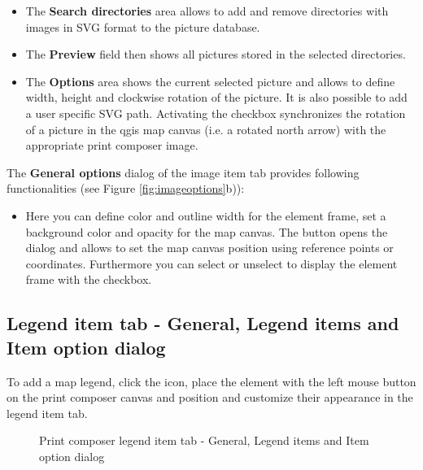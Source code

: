 \begin{itemize}[label=--]
\item The \textbf{Search directories} area allows to add and remove
directories with images in SVG format to the picture database. 
\item The \textbf{Preview} field then shows all pictures stored in the
selected directories.
\item The \textbf{Options} area shows the current selected picture and allows
to define width, height and clockwise rotation of the picture. It is also possible 
to add a user specific SVG path. Activating the
 checkbox synchronizes the rotation of a picture in
the qgis map canvas (i.e. a rotated north arrow) with the appropriate print
composer image.
\end{itemize}


The \textbf{General options} dialog of the image item tab provides following
functionalities (see Figure \ref{fig:imageoptions}b)):

\begin{itemize}[label=--]
\item Here you can define color and outline width for the element frame, set
a background color and opacity for the map canvas. The 
button opens the  dialog and allows to set the map
canvas position using reference points or coordinates. Furthermore you can
select or unselect to display the element frame with the  checkbox.
\end{itemize}

\subsection{Legend item tab - General, Legend items and Item option dialog }

To add a map legend, click the 
icon, place the element with the left mouse button on the print composer
canvas and position and customize their appearance in the legend item tab.

\begin{figure}[h]
\centering
   \hspace{1cm}
   \hspace{1cm}
   \caption{Print composer legend item tab - General, Legend items and Item option dialog\nixcaption}\label{fig:legendoptions}
\end{figure}

